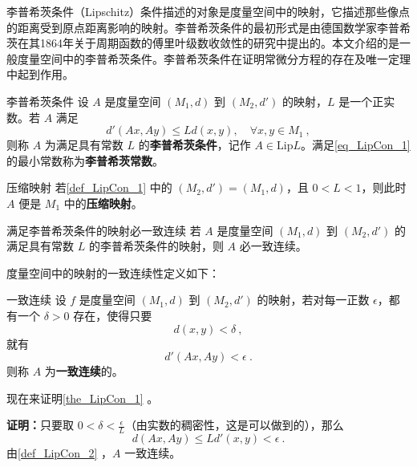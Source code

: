 
李普希茨条件（Lipschitz）条件描述的对象是度量空间中的映射，它描述那些像点的距离受到原点距离影响的映射。李普希茨条件的最初形式是由德国数学家李普希茨在其1864年关于周期函数的傅里叶级数收敛性的研究中提出的\cite{Li}。本文介绍的是一般度量空间中的李普希茨条件。李普希茨条件在证明常微分方程的存在及唯一定理中起到作用。
\begin{definition}{李普希茨条件}\label{def_LipCon_1}
设 $A$ 是度量空间 $(M_1,d)$ 到 $(M_2,d')$ 的映射，$L$ 是一个正实数。若 $A$ 满足
\begin{equation}\label{eq_LipCon_1}
d'(Ax,Ay)\leq Ld(x,y),\quad\forall x,y\in M_1~,
\end{equation}
则称 $A$ 为满足具有常数 $L$ 的\textbf{李普希茨条件}，记作 $A\in \mathrm{Lip} L$。满足\autoref{eq_LipCon_1} 的最小常数称为\textbf{李普希茨常数}。
\end{definition}
\begin{example}{压缩映射}
若\autoref{def_LipCon_1} 中的 $(M_2,d')=(M_1,d)$，且 $0<L<1$，则此时 $A$ 便是 $M_1$ 中的\textbf{压缩映射}。
\end{example}

\begin{theorem}{满足李普希茨条件的映射必一致连续}\label{the_LipCon_1}
若 $A$ 是度量空间 $(M_1,d)$ 到 $(M_2,d')$ 的满足具有常数 $L$ 的李普希茨条件的映射，则 $A$ 必一致连续。
\end{theorem}
度量空间中的映射的一致连续性定义如下：
\begin{definition}{一致连续}\label{def_LipCon_2}
设 $f$ 是度量空间 $(M_1,d)$ 到 $(M_2,d')$ 的映射，若对每一正数 $\epsilon$，都有一个 $\delta>0$ 存在，使得只要
\begin{equation}
d(x,y)<\delta~,
\end{equation}
就有
\begin{equation}
d'(Ax,Ay)<\epsilon~.
\end{equation}
则称 $A$ 为\textbf{一致连续}的。

\end{definition}
现在来证明\autoref{the_LipCon_1} 。

\textbf{证明：}只要取 $0<\delta<\frac{\epsilon}{L}$（由实数的稠密性，这是可以做到的），那么
\begin{equation}
d(Ax,Ay)\leq Ld'(x,y)< \epsilon~.
\end{equation}
由\autoref{def_LipCon_2} ，$A$ 一致连续。

